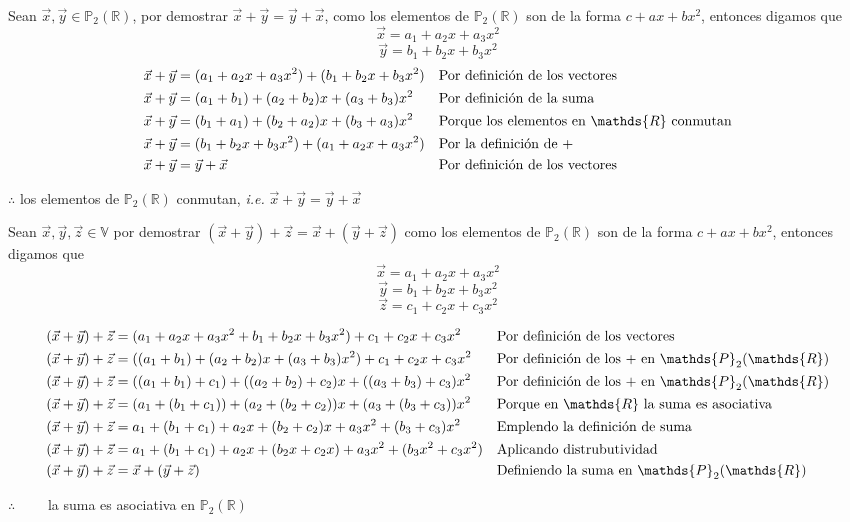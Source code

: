\documentclass[letterpaper]{article}
\newcommand{\V}{\mathds{V}}
\newcommand{\R}{\mathds{R}}
\newcommand{\Po}{\mathds{P}_2(\mathds{R})}
\renewcommand{\*}{\cdot}
\theoremstyle{definition}
\begin{document}
Sean $ \vec{x}, \vec{y} \in \Po $, por demostrar $\vec{x} + \vec{y} = \vec{y} + \vec{x}  $, como los elementos de $ \Po $ son de la forma $ c + ax + bx^2$, entonces digamos que \[ \vec{x} = a_1 + a_2x + a_3x^2 \] \[ \vec{y} = b_1 + b_2x + b_3x^2 \]
\begin{align*}
	\vec{x} + \vec{y} &=  (a_1 + a_2x + a_3x^2) + (b_1 + b_2x + b_3x^2) && \text{Por definición de los vectores}\\
	\vec{x} + \vec{y} &=  (a_1 + b_1) + (a_2 + b_2)x + (a_3 + b_3)x^2&& \text{Por definición de la suma}\\
	\vec{x} + \vec{y} &=  (b_1 + a_1) + (b_2 + a_2)x + (b_3 + a_3)x^2&& \text{Porque los elementos en $ \R $ conmutan}\\
	\vec{x} + \vec{y} &=  (b_1 + b_2x + b_3x^2) + (a_1 + a_2x + a_3x^2) && \text{Por la definición de +}\\
	\vec{x} + \vec{y} &=  \vec{y} + \vec{x}&& \text{Por definición de los vectores}\\
\end{align*}
\begin{center}
	$ \therefore $ los elementos de $ \Po $ conmutan, \textit{i.e.} $ \vec{x} + \vec{y} = 	\vec{y} + \vec{x} $
\end{center}

Sean $ \vec{x}, \vec{y}, \vec{z} \in \V $ por demostrar $  (\vec{x} + \vec{y}) + \vec{z} = \vec{x} + (\vec{y} + \vec{z})$
como los elementos de $ \Po $ son de la forma $ c + ax + bx^2$, entonces digamos que \[ \vec{x} = a_1 + a_2x + a_3x^2 \] \[ \vec{y} = b_1 + b_2x + b_3x^2 \] \[ \vec{z} = c_1 + c_2x + c_3x^2 \]

\begin{align*}
	(\vec{x} + \vec{y}) + \vec{z} &= ( a_1 + a_2x + a_3x^2 + b_1 + b_2x + b_3x^2) + c_1 + c_2x + c_3x^2&& \text{Por definición de los vectores}\\
	(\vec{x} + \vec{y}) + \vec{z} &= ( (a_1 + b_1)  + (a_2 + b_2)x + (a_3 + b_3) x^2 ) + c_1 + c_2x + c_3x^2&& \text{Por definición de los + en $ \Po $}\\ 
	(\vec{x} + \vec{y}) + \vec{z} &= ((a_1 + b_1) + c_1)  + ((a_2 + b_2) + c_2 )x + ((a_3 + b_3) + c_3) x^2 && \text{Por definición de los + en $ \Po $}\\ 
	(\vec{x} + \vec{y}) + \vec{z} &= (a_1 + (b_1 + c_1))  + (a_2 + (b_2 + c_2))x + (a_3 + (b_3 + c_3)) x^2 && \text{Porque en $ \R $ la suma es asociativa}\\ 
	(\vec{x} + \vec{y}) + \vec{z} &= a_1 + (b_1 + c_1)  + a_2x + (b_2 + c_2)x + a_3x^2 + (b_3 + c_3)x^2 && \text{Emplendo la definición de suma}\\ 
	(\vec{x} + \vec{y}) + \vec{z} &= a_1 + (b_1 + c_1)  + a_2x + (b_2x + c_2x) + a_3x^2 + (b_3x^2 + c_3x^2) && \text{Aplicando distrubutividad}\\ 
	(\vec{x} + \vec{y}) + \vec{z} &= \vec{x} + (\vec{y} + \vec{z}) && \text{Definiendo la suma en $ \Po $}\\ 
\end{align*}
\begin{center}
	$ \therefore \qquad $ la suma es asociativa en $ \Po $
\end{center}
\end{document}
